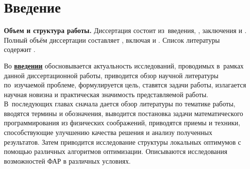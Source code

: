 \chapter*{Введение}                         %

\newcommand{\actuality}{}
\newcommand{\progress}{}
\newcommand{\aim}{{\textbf\aimTXT}}
\newcommand{\tasks}{\textbf{\tasksTXT}}
\newcommand{\novelty}{\textbf{\noveltyTXT}}
\newcommand{\influence}{\textbf{\influenceTXT}}
\newcommand{\methods}{\textbf{\methodsTXT}}
\newcommand{\defpositions}{\textbf{\defpositionsTXT}}
\newcommand{\reliability}{\textbf{\reliabilityTXT}}
\newcommand{\probation}{\textbf{\probationTXT}}
\newcommand{\contribution}{\textbf{\contributionTXT}}
\newcommand{\publications}{\textbf{\publicationsTXT}}



\textbf{Объем и структура работы.} Диссертация состоит из~введения,
,
заключения и
.
%
Полный объём диссертации составляет
, включая
 и
.
Список литературы содержит
.

Во \underline{\textbf{введении}} обосновывается актуальность
исследований, проводимых в~рамках данной диссертационной работы,
приводится обзор научной литературы по~изучаемой проблеме,
формулируется цель, ставятся задачи работы, излагается научная новизна
и практическая значимость представляемой работы. В~последующих главах
сначала дается обзор литературы по тематике работы, вводятся термины и обозначения, выводится постановка
задачи математического программирования из физических соображений, приводятся
приемы и техники, способствующие улучшению качества решения и анализу полученных
результатов. Затем приводится исследование структуры локальных оптимумов с помощью различных алгоритмов оптимизации. Описываются исследования возможностей ФАР в различных условиях.


